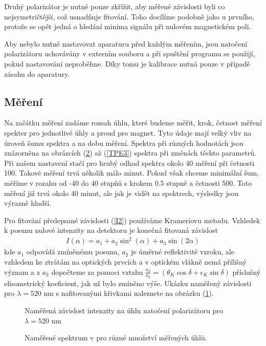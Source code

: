 Druhý polarizátor je nutné pouze zkřížit, aby měřené závislosti byli co nejsymetričtější, což usnadňuje fitování. Toho docílíme podobně jako u prvního, protože se opět jedná o hledání minima signálu při nulovém magnetickém poli.

Aby nebylo nutné nastavovat aparaturu před každým měřením, jsou natočení polarizátoru uchovávány v externím souboru a při spuštění programu se použijí, pokud nastavování neproběhne. Díky tomu je kalibrace nutná pouze v případě zásahu do aparatury. 


\subsection{Měření}
Na začátku měření zadáme rozsah úhlu, které budeme měřit, krok, četnost měření spekter pro jednotlivé úhly a proud pro magnet. Tyto údaje mají velký vliv na úroveň šumu spektra a na dobu měření. Spektra při různých hodnotách jsou znázorněna na obrázcích (\ref{TPE1}) až (\ref{TPE3}) spektra při změnách těchto parametrů. Při našem nastavení stačí pro hrubý odhad spektra okolo 40 měření při četnosti 100. Takové měření trvá několik málo minut. Pokud však chceme minimální šum, měříme v rozahu od -40 do 40 stupňů s krokem 0.5 stupně a četnosti 500. Toto měření již trvá okolo 40 minut, ale jak je vidět na spektrech, výsledky jsou výrazně hladší.

Pro fitování předepsané závislosti (\ref{I2}) používáme Krameriovu metodu. Vzhledek k posunu nulové intenzity na detektoru je konečná fitovaná závislost
\begin{eqnarray}
I(\alpha)=a_1+a_2\sin^2(\alpha)+a_3\sin(2\alpha)
\end{eqnarray}
kde $a_1$ odpovídá zmíněnému posunu, $a_2$ je úměrné reflektivitě vzroku, ale vzhledem ke ztrátám na optických prvcích a v optickém vlákně nemá přílišný význam a z $a_3$ dopočteme za pomoci vztahu $\frac{a_3}{a_2}=(\theta_K\cos\delta+\epsilon_K\sin\delta)$ příslušný elisometrický koeficient, jak už bylo zmíněno výše. Ukázku naměřený závislosti pro $\lambda=520$ nm s nafitovanými křivkami naleznete na obrázku (\ref{TPE0}).

\begin{figure}

\caption{Naměřená závislost intenzity na úhlu natočení polarizátoru pro $\lambda =520$ nm}
\label{TPE0}
\end{figure}

\begin{figure}

\caption{Naměřené spektrum v pro různé množství měřených úhlů.}
\label{TPE1}
\end{figure}

